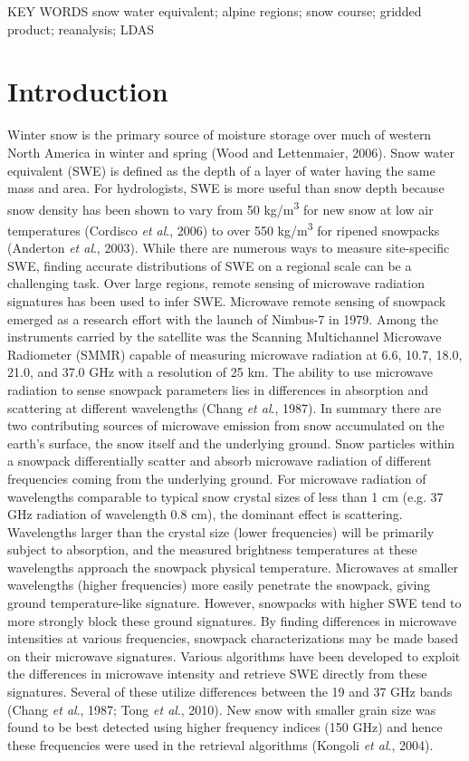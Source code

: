 \documentclass[12pt]{article}
\begin{document}
\bigskip
\noindent KEY WORDS \: snow water equivalent; alpine regions; snow course; gridded product; reanalysis; LDAS

\section{Introduction}
Winter snow is the primary source of moisture storage over much of western North America in winter and spring (Wood and Lettenmaier, 2006). Snow water equivalent (SWE) is defined as the depth of a layer of water having the same mass and area. For hydrologists, SWE is more useful than snow depth because snow density has been shown to vary from 50 kg/m\textsuperscript{3} for new snow at low air temperatures (Cordisco \textit{et al}., 2006) to over 550 kg/m\textsuperscript{3} for ripened snowpacks (Anderton \textit{et al}., 2003). While there are numerous ways to measure site-specific SWE, finding accurate distributions of SWE on a regional scale can be a challenging task.  Over large regions, remote sensing of microwave radiation signatures has been used to infer SWE.
Microwave remote sensing of snowpack emerged as a research effort with the launch of Nimbus-7 in 1979. Among the instruments carried by the satellite was the Scanning Multichannel Microwave Radiometer (SMMR) capable of measuring microwave radiation at 6.6, 10.7, 18.0, 21.0, and 37.0 GHz with a resolution of 25 km. The ability to use microwave radiation to sense snowpack parameters lies in differences in absorption and scattering at different wavelengths (Chang \textit{et al}., 1987). In summary there are two contributing sources of microwave emission from snow accumulated on the earth's surface, the snow itself and the underlying ground. Snow particles within a snowpack differentially scatter and absorb microwave radiation of different frequencies coming from the underlying ground. For microwave radiation of wavelengths comparable to typical snow crystal sizes of less than 1 cm (e.g. 37 GHz radiation of wavelength 0.8 cm), the dominant effect is scattering. Wavelengths larger than the crystal size (lower frequencies) will be primarily subject to absorption, and the measured brightness temperatures at these wavelengths approach the snowpack physical temperature. Microwaves at smaller wavelengths (higher frequencies) more easily penetrate the snowpack, giving ground temperature-like signature. However, snowpacks with higher SWE tend to more strongly block these ground signatures. By finding differences in microwave intensities at various frequencies, snowpack characterizations may be made based on their microwave signatures. Various algorithms have been developed to exploit the differences in microwave intensity and retrieve SWE directly from these signatures. Several of these utilize differences between the 19 and 37 GHz bands (Chang \textit{et al}., 1987; Tong \textit{et al}., 2010). New snow with smaller grain size was found to be best detected using higher frequency indices (150 GHz) and hence these frequencies were used 
in the retrieval algorithms (Kongoli \textit{et al}., 2004). 
\end{document}
